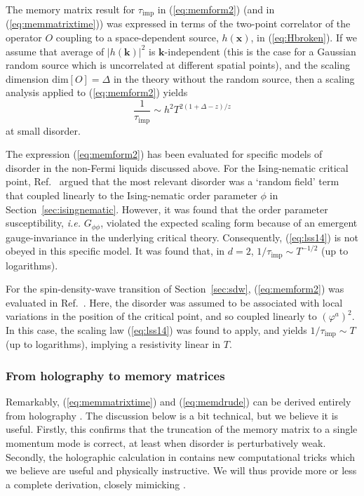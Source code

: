 \documentclass[10pt, oneside]{book}
\begin{document}
\begin{doublespace}
The memory matrix result for $\tau_{\mathrm{imp}}$ in (\ref{eq:memform2}) (and in (\ref{eq:memmatrixtime})) was expressed
in terms of the two-point correlator of the operator $O$ coupling to a space-dependent source, $h (\mathbf{x})$, in (\ref{eq:Hbroken}). 
If we assume that average of $|h(\mathbf{k})|^2$ is $\mathbf{k}$-independent (this is the case for a Gaussian random source which is
uncorrelated at different spatial points), and the scaling dimension $\mbox{dim}[O] = \Delta$ in the theory without the random source, 
then a scaling analysis applied to (\ref{eq:memform2}) yields \cite{lucas1401}
\begin{equation}
\frac{1}{\tau_{\mathrm{imp}}} \sim h^2 T^{2(1+\Delta-z)/z} \label{eq:lss14}
\end{equation}
at small disorder. 

The expression (\ref{eq:memform2}) has been evaluated for specific models of disorder in the
non-Fermi liquids discussed above. For the Ising-nematic critical point, Ref.~\cite{Hartnoll:2014gba} argued that the most relevant disorder
was a `random field' term that coupled linearly to the Ising-nematic order parameter $\phi$ in Section~\ref{sec:isingnematic}.
However, it was found that the order parameter susceptibility, {\em i.e.\/} $G_{\phi\phi}$, violated the expected scaling form
because of an emergent gauge-invariance in the underlying critical theory. Consequently, (\ref{eq:lss14}) is not obeyed in this 
specific model. It was found that, in $d=2$, ${1}/{\tau_{\mathrm{imp}}} \sim T^{-1/2}$ (up to logarithms).

For the spin-density-wave transition of Section~\ref{sec:sdw}, (\ref{eq:memform2}) was evaluated in Ref.~\cite{Patel:2014jfa}.
Here, the disorder was assumed to be associated with local variations in the position of the critical point, and so coupled linearly to
$(\varphi^a)^2$. In this case, the scaling law (\ref{eq:lss14}) was found to apply, and yields ${1}/{\tau_{\mathrm{imp}}} \sim T$ (up to logarithms),
implying a resistivity linear in $T$.
 
\subsubsection{From holography to memory matrices}
\label{sec:memmatrixderivation}
Remarkably, (\ref{eq:memmatrixtime}) and (\ref{eq:memdrude}) can be derived entirely from holography \cite{Lucas:2015vna}.   The discussion below is a bit technical, but we believe it is useful.   Firstly, this confirms that the truncation of the memory matrix to a single momentum mode is correct, at least when disorder is perturbatively weak.   Secondly, the holographic calculation in \cite{Lucas:2015vna} contains new computational tricks which we believe are  useful and physically instructive.  We will thus provide more or less a complete derivation, closely mimicking \cite{Lucas:2015vna}.


\end{doublespace}
\end{document}

